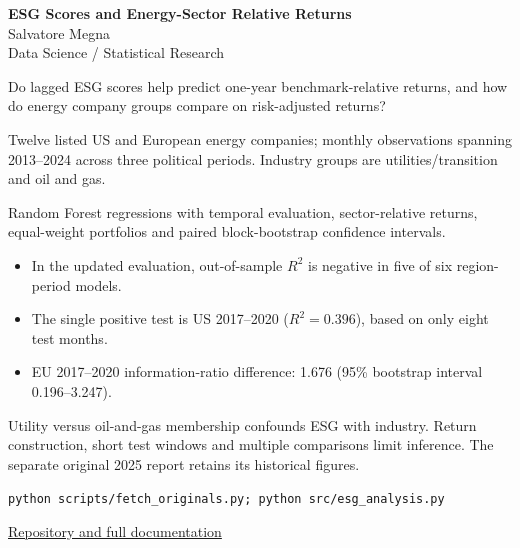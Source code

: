 \documentclass[12pt,a4paper]{article}
\begin{document}
\begin{center}
{\Large\bfseries ESG Scores and Energy-Sector Relative Returns}\\[0.65em]
{\normalsize Salvatore Megna}\\[0.25em]
{\small Data Science / Statistical Research}
\end{center}
\vspace{1.1em}
\par
\vspace{1.15em}
\par
Do lagged ESG scores help predict one-year benchmark-relative returns, and how do energy company groups compare on risk-adjusted returns?
\par
\par
\vspace{1.15em}
\par
Twelve listed US and European energy companies; monthly observations spanning 2013--2024 across three political periods. Industry groups are utilities/transition and oil and gas.

Random Forest regressions with temporal evaluation, sector-relative returns, equal-weight portfolios and paired block-bootstrap confidence intervals.
\par
\par
\vspace{1.15em}
\par
\begin{itemize}
\item In the updated evaluation, out-of-sample $R^2$ is negative in five of six region-period models.
\item The single positive test is US 2017--2020 ($R^2=0.396$), based on only eight test months.
\item EU 2017--2020 information-ratio difference: 1.676 (95\% bootstrap interval 0.196--3.247).
\end{itemize}
\par
\par
\vspace{1.15em}
\par
Utility versus oil-and-gas membership confounds ESG with industry. Return construction, short test windows and multiple comparisons limit inference. The separate original 2025 report retains its historical figures.
\par
\par
\vspace{1.15em}
\par
\texttt{python scripts/fetch\_originals.py; python src/esg\_analysis.py}
\par
\vfill
\noindent\small\href{https://github.com/Salvatore-Megna/esg-energy-return-modeling}{Repository and full documentation}
\end{document}
